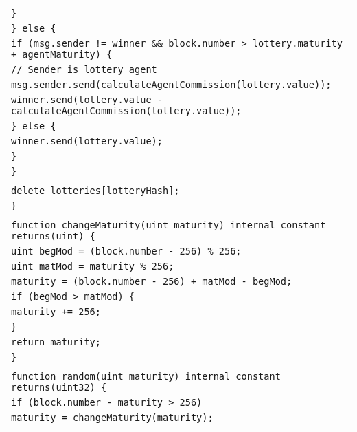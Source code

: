 \documentclass[a4paper]{article}
\begin{document}
\begin{tabularx}{\linewidth}{l}
        \qquad\qquad\qquad\texttt{\}}\\
        \qquad\qquad\texttt{\} else \{}\\
        \qquad\qquad\qquad\texttt{if (msg.sender != winner \&\& block.number > lottery.maturity + agentMaturity) \{}\\
        \qquad\qquad\qquad\qquad\texttt{// Sender is~lottery agent}\\
        \qquad\qquad\qquad\qquad\texttt{msg.sender.send(calculateAgentCommission(lottery.value));}\\
        \qquad\qquad\qquad\qquad\texttt{winner.send(lottery.value - calculateAgentCommission(lottery.value));}\\
        \qquad\qquad\qquad\texttt{\} else \{}\\
        \qquad\qquad\qquad\qquad\texttt{winner.send(lottery.value);}\\
        \qquad\qquad\qquad\texttt{\}}\\
        \qquad\qquad\texttt{\}}\\
        \\
        \qquad\qquad\texttt{delete lotteries[lotteryHash];}\\
        \qquad\texttt{\}}\\
        \\
        \qquad\texttt{function changeMaturity(uint maturity) internal constant returns(uint) \{}\\
        \qquad\qquad\texttt{uint begMod = (block.number - 256) \% 256;}\\
        \qquad\qquad\texttt{uint matMod = maturity \% 256;}\\
        \qquad\qquad\texttt{maturity = (block.number - 256) + matMod - begMod;}\\
        \qquad\qquad\texttt{if (begMod > matMod) \{}\\
        \qquad\qquad\qquad\texttt{maturity += 256;}\\
        \qquad\qquad\texttt{\}}\\
        \qquad\qquad\texttt{return maturity;}\\
        \qquad\texttt{\}}\\
        \\
        \qquad\texttt{function random(uint maturity) internal constant returns(uint32) \{}\\
        \qquad\qquad\texttt{if (block.number - maturity > 256)}\\
        \qquad\qquad\qquad\texttt{maturity = changeMaturity(maturity);}\\

\end{tabularx}
\end{document}

